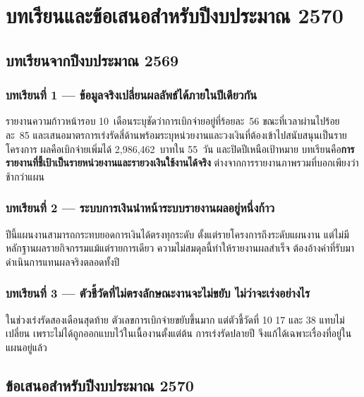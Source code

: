 \chapter{บทเรียนและข้อเสนอสำหรับปีงบประมาณ 2570}

\section{บทเรียนจากปีงบประมาณ 2569}

\subsection{บทเรียนที่ 1 --- ข้อมูลจริงเปลี่ยนผลลัพธ์ได้ภายในปีเดียวกัน}
รายงานความก้าวหน้ารอบ 10~เดือนระบุชัดว่าการเบิกจ่ายอยู่ที่ร้อยละ~56 ขณะที่เวลาผ่านไปร้อยละ~85
และเสนอมาตรการเร่งรัดสี่ด้านพร้อมระบุหน่วยงานและวงเงินที่ต้องเข้าไปสนับสนุนเป็นรายโครงการ
ผลคือเบิกจ่ายเพิ่มได้ 2,986,462~บาทใน 55~วัน และปิดปีเหนือเป้าหมาย
บทเรียนคือ\textbf{การรายงานที่ชี้เป้าเป็นรายหน่วยงานและรายวงเงินใช้งานได้จริง}
ต่างจากการรายงานภาพรวมที่บอกเพียงว่าช้ากว่าแผน

\subsection{บทเรียนที่ 2 --- ระบบการเงินนำหน้าระบบรายงานผลอยู่หนึ่งก้าว}
ปีนี้แผนงานสามารถกระทบยอดการเงินได้ตรงทุกระดับ ตั้งแต่รายโครงการถึงระดับแผนงาน
แต่ไม่มีหลักฐานผลรายกิจกรรมแม้แต่รายการเดียว ความไม่สมดุลนี้ทำให้รายงานผลสำเร็จ
ต้องอ้างค่าที่รับมาดำเนินการแทนผลจริงตลอดทั้งปี

\subsection{บทเรียนที่ 3 --- ตัวชี้วัดที่ไม่ตรงลักษณะงานจะไม่ขยับ ไม่ว่าจะเร่งอย่างไร}
ในช่วงเร่งรัดสองเดือนสุดท้าย ตัวเลขการเบิกจ่ายขยับขึ้นมาก แต่ตัวชี้วัดที่ 10 17 และ 38
แทบไม่เปลี่ยน เพราะไม่ได้ถูกออกแบบไว้ในเนื้องานตั้งแต่ต้น การเร่งรัดปลายปี
จึงแก้ได้เฉพาะเรื่องที่อยู่ในแผนอยู่แล้ว

\section{ข้อเสนอสำหรับปีงบประมาณ 2570}


